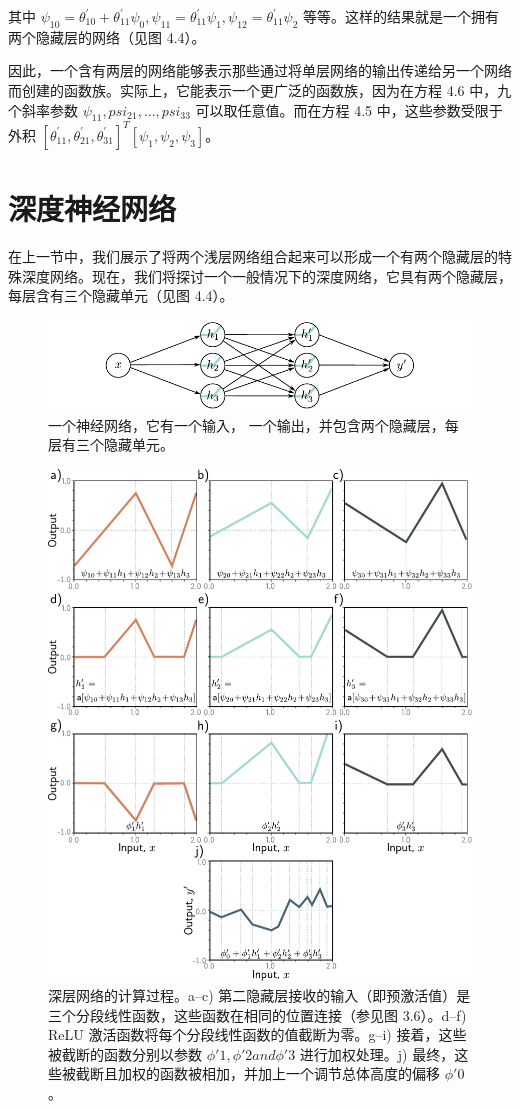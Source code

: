 \documentclass[lang=cn,newtx,10pt,scheme=chinese]{elegantbook}
\begin{document}
其中 \(\psi_{10} = \theta^\prime_{10} + \theta^\prime_{11} \psi_0, \psi_{11} = \theta^\prime_{11}\psi_1 , \psi_{12} = \theta^\prime_{11}\psi_2\) 等等。这样的结果就是一个拥有两个隐藏层的网络（见图 4.4）。

因此，一个含有两层的网络能够表示那些通过将单层网络的输出传递给另一个网络而创建的函数族。实际上，它能表示一个更广泛的函数族，因为在方程 4.6 中，九个斜率参数 \(\psi_{11}, psi_{21}, ..., psi_{33}\) 可以取任意值。而在方程 4.5 中，这些参数受限于外积 \([\theta^\prime_{11},\theta^\prime_{21},\theta^\prime_{31}]^T[\psi_1, \psi_2, \psi_3]\)。

\section{深度神经网络}
在上一节中，我们展示了将两个浅层网络组合起来可以形成一个有两个隐藏层的特殊深度网络。现在，我们将探讨一个一般情况下的深度网络，它具有两个隐藏层，每层含有三个隐藏单元（见图 4.4）。


\begin{figure}[ht!]
	\centering
	\includegraphics[width=0.7\linewidth]{PDFFigures/UDLChap4PDF/DeepTwoLayer.pdf}
	\caption{ 一个神经网络，它有一个输入， 一个输出，并包含两个隐藏层，每层有三个隐藏单元。}
\end{figure}


\begin{figure}[ht!]
	\centering
	\includegraphics[width=0.7\linewidth]{PDFFigures/UDLChap4PDF/DeepBuildUp.pdf}
	\caption{深层网络的计算过程。a–c) 第二隐藏层接收的输入（即预激活值）是三个分段线性函数，这些函数在相同的位置连接（参见图 3.6）。d–f) ReLU 激活函数将每个分段线性函数的值截断为零。g–i) 接着，这些被截断的函数分别以参数 \(\phi \prime 1, \phi \prime 2 and \phi \prime 3\) 进行加权处理。j) 最终，这些被截断且加权的函数被相加，并加上一个调节总体高度的偏移 \(\phi \prime 0\)。}
\end{figure}
\end{document}
